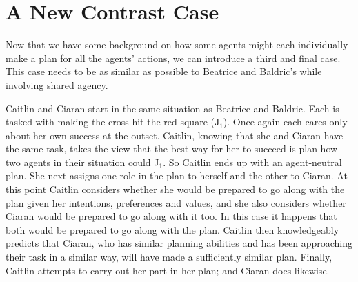\documentclass[12pt,\papersize]{extarticle}
\begin{document}
	
	
\section{A New Contrast Case}
\label{sec:new_contrast_case}
Now that we have some background on how some agents might each individually make a plan for all the agents' actions,
we can introduce a third and final case.
This case needs to be as similar as possible to Beatrice and Baldric's while involving shared agency.

Caitlin and Ciaran start in the same situation as Beatrice and Baldric. 
Each is tasked with making the cross hit the red square (J$_1$). 
Once again each cares only about her own success at the outset. 
Caitlin, knowing that she and Ciaran have the same task, takes the view that the best way for her to succeed is plan how two agents in their situation could J$_1$.  
So Caitlin ends up with an agent-neutral plan.
She next assigns one role in the plan to herself and the other to Ciaran.
At this point Caitlin considers whether she would be prepared to go along with the plan given her intentions, preferences and values, and she also considers whether Ciaran would be prepared to go along with it too. 
In this case it happens that both would be prepared to go along with the plan.
Caitlin then knowledgeably predicts that Ciaran, who has similar planning abilities and has been approaching their task in a similar way, will have made a sufficiently similar plan.
Finally, Caitlin attempts to carry out her part in her plan; and Ciaran does likewise.
\end{document}
